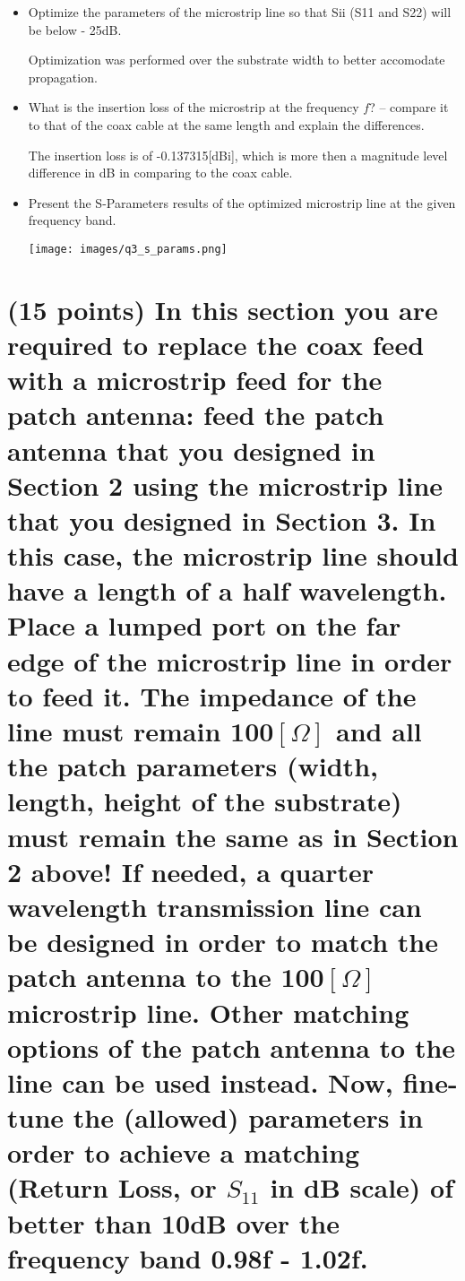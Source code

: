 \documentclass[12pt, letterpaper]{article}
\begin{document}
\begin{itemize}
  \item Optimize the parameters of the microstrip line so that Sii (S11 and S22) will be below - 25dB.

  {\color{blue}Optimization was performed over the substrate width to better accomodate propagation.}
  \item What is the insertion loss of the microstrip at the frequency $f$? -- compare it to that of the coax cable at the same length and explain the differences.

  {\color{blue}The insertion loss is of -0.137315[dBi], which is more then a magnitude level difference in dB in comparing to the coax cable.}
  \item Present the S-Parameters results of the optimized microstrip line at the given frequency band.

  \texttt{[image: images/q3\_s\_params.png]}
\end{itemize}

\section{(15 points) In this section you are required to replace the coax feed with a microstrip feed for the patch antenna: feed the patch antenna that you designed in Section 2 using the microstrip line that you designed in Section 3. In this case, the microstrip line should have a length of a half wavelength. Place a lumped port on the far edge of the microstrip line in order to feed it. The impedance of the line must remain 100$[\Omega]$ and all the patch parameters (width, length, height of the substrate) must remain the same as in Section 2 above! If needed, a quarter wavelength transmission line can be designed in order to match the patch antenna to the 100$[\Omega]$ microstrip line. Other matching options of the patch antenna to the line can be used instead. Now, fine-tune the (allowed) parameters in order to achieve a matching (Return Loss, or $S_{11}$ in dB scale) of better than 10dB over the frequency band 0.98f - 1.02f.}
\end{document}
